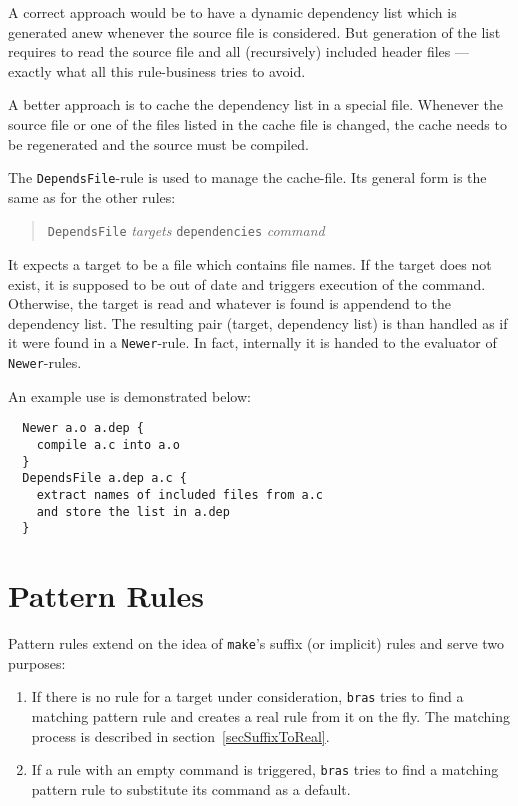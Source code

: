 \documentclass[12pt]{article}
\newcommand{\bras}{\texttt{bras}}
\newcommand{\make}{\texttt{make}}
\begin{document}
A correct approach would be to have a dynamic dependency list which is
generated anew whenever the source file is considered. But generation
of the list requires to read the source file and all (recursively)
included header files --- exactly what all this rule-business tries to
avoid.

A better approach is to cache the dependency list in a special
file. Whenever the source file or one of the files listed in the
cache file is changed, the cache needs to be regenerated and the
source must be compiled.

The \texttt{DependsFile}-rule is used to manage the cache-file. Its
general form is the same as for the other rules:
\begin{quote}
  \texttt{DependsFile} \textit{targets} \texttt{dependencies}
 \textit{command}
\end{quote}

It expects a target to be a file which contains file names. If the
target does not exist, it is supposed to be out of date and triggers
execution of the command. Otherwise, the target is read and whatever
is found is appendend to the dependency list. The resulting pair 
(target, dependency list) is than handled as if it were found in a
\texttt{Newer}-rule. In fact, internally it is handed to the
evaluator of \texttt{Newer}-rules.

An example use is demonstrated below:

\begin{verbatim}
  Newer a.o a.dep {
    compile a.c into a.o
  }
  DependsFile a.dep a.c {
    extract names of included files from a.c 
    and store the list in a.dep
  }
\end{verbatim}
\section{Pattern Rules}

Pattern rules extend on the idea of \make's suffix (or implicit)
rules and serve two purposes:

\begin{enumerate}
\item 
If there is no rule for a target under consideration, \bras{}
tries to find a matching pattern rule and creates a real rule from it on
the fly. The matching process is described in
section~\ref{secSuffixToReal}.
\item 
If a rule with an empty command is triggered, \bras{} tries
to find a matching pattern rule to substitute its command as a default.
\end{enumerate}
\end{document}
